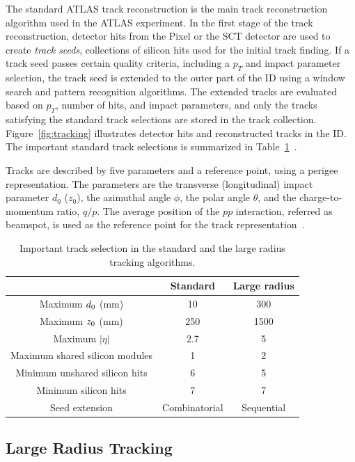 The standard ATLAS track reconstruction is the main track reconstruction algorithm used in the ATLAS experiment. In the first stage of the track reconstruction, detector hits from the Pixel or the SCT detector are used to create \textit{track seeds}, collections of silicon hits used for the initial track finding. If a track seed passes certain quality criteria, including a $p_{T}$ and impact parameter selection, the track seed is extended to the outer part of the ID using a window search and pattern recognition algorithms. The extended tracks are evaluated based on $p_{T}$, number of hits, and impact parameters, and only the tracks satisfying the standard track selections are stored in the track collection. Figure~\ref{fig:tracking} illustrates detector hits and reconstructed tracks in the ID. The important standard track selections is summarized in Table~\ref{table:tracking}~\cite{ATL-PHYS-PUB-2017-014}.


Tracks are described by five parameters and a reference point, using a perigee representation. The parameters are the transverse (longitudinal) impact parameter $d_{0}$ ($z_{0}$), the azimuthal angle $\phi$, the polar angle $\theta$, and the charge-to-momentum ratio, $q/p$. The average position of the $pp$ interaction, referred as beamspot, is used as the reference point for the track representation~\cite{Aaboud:2016rmg}.


\begin{table}[!htb]
  \centering
  \begin{tabular}{ c  c  c }
    \hline
    & Standard & Large radius \\ [0.5ex]
    \hline
    Maximum $d_{\rm{0}}$ (mm) & 10 & 300 \\
    Maximum $z_{\rm{0}}$ (mm) & 250 & 1500 \\
    Maximum $|\eta|$ & 2.7 & 5 \\
    Maximum shared silicon modules & 1 & 2 \\
    Minimum unshared silicon hits& 6 & 5 \\
    Minimum silicon hits & 7 & 7\\
    Seed extension & Combinatorial & Sequential \\
    \hline
  \end{tabular}
  \caption{Important track selection in the standard and the large radius tracking algorithms.}
  \label{table:tracking}
\end{table}


\subsection{Large Radius Tracking}
\label{sec:reco:lrt}

